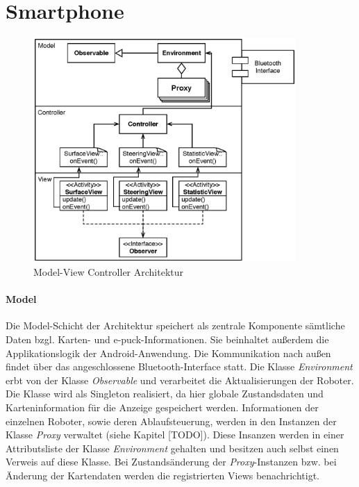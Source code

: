 \documentclass[10pt,a4paper]{article}
\let\oldsection\section
\renewcommand{\section}{\newpage \oldsection}
\begin{document}
	\section{Smartphone}
			\begin{figure}
				\centering
				\includegraphics[width=10cm]{images/android_mvc.eps}
  				\caption{Model-View Controller Architektur}
  			\end{figure}	
			\paragraph*{Model}
  				Die Model-Schicht der Architektur speichert als zentrale Komponente sämtliche Daten bzgl. Karten- und e-puck-Informationen. 
  				Sie beinhaltet außerdem die Applikationslogik der Android-Anwendung. Die Kommunikation nach außen findet über das
  				angeschlossene Bluetooth-Interface statt. Die Klasse \textit{Environment} erbt von der Klasse \textit{Observable} und verarbeitet
  				die Aktualisierungen der Roboter. Die Klasse wird als Singleton realisiert, da hier globale Zustandsdaten und Karteninformation
  				für die Anzeige gespeichert werden. Informationen der einzelnen Roboter, sowie deren Ablaufsteuerung, werden in den Instanzen
  				der Klasse \textit{Proxy} verwaltet (siehe Kapitel [TODO]). Diese Insanzen werden in einer Attributsliste der Klasse \textit{Environment}
  				gehalten und besitzen auch selbst einen Verweis auf diese Klasse. Bei	Zustandsänderung der \textit{Proxy}-Instanzen bzw. bei
  				Änderung der Kartendaten werden die registrierten Views benachrichtigt.
\end{document}
